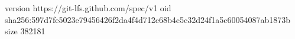version https://git-lfs.github.com/spec/v1
oid sha256:597d7fe5023e79456426f2da4f4d712c68b4c5c32d24f1a5c60054087ab1873b
size 382181
